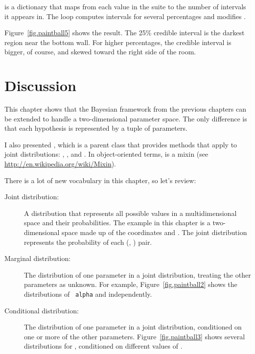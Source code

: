 \documentclass[12pt]{book}
\theoremstyle{exercise}
\begin{document}
 is a dictionary that maps from each value in the suite
to the number of intervals it appears in.  The loop computes intervals
for several percentages and modifies .

Figure~\ref{fig.paintball5} shows the result.  The 25\% credible
interval is the darkest region near the bottom wall.  For higher
percentages, the credible interval is bigger, of course, and skewed
toward the right side of the room.


\section{Discussion}

This chapter shows that the Bayesian framework from the previous
chapters can be extended to handle a two-dimensional parameter space.
The only difference is that each hypothesis is represented by
a tuple of parameters.

I also presented , which is a parent class that provides
methods that apply to joint distributions:
, , and .
In object-oriented terms,
 is a mixin (see \url{http://en.wikipedia.org/wiki/Mixin}).

There is a lot of new vocabulary in this chapter, so let's review:

\begin{description}

\item[Joint distribution:] A distribution that represents all possible
  values in a multidimensional space and their probabilities.  The
  example in this chapter is a two-dimensional space made up of the
  coordinates  and .  The joint distribution
  represents the probability of each (, ) pair.

\item[Marginal distribution:] The distribution of one parameter in a
  joint distribution, treating the other parameters as unknown.  For
  example, Figure~\ref{fig.paintball2} shows the distributions of {\tt
    alpha} and  independently.

\item[Conditional distribution:] The distribution of one parameter in
  a joint distribution, conditioned on one or more of the other
  parameters.  Figure~\ref{fig.paintball3} shows several distributions for
  , conditioned on different values of .

\end{description}
\end{document}
